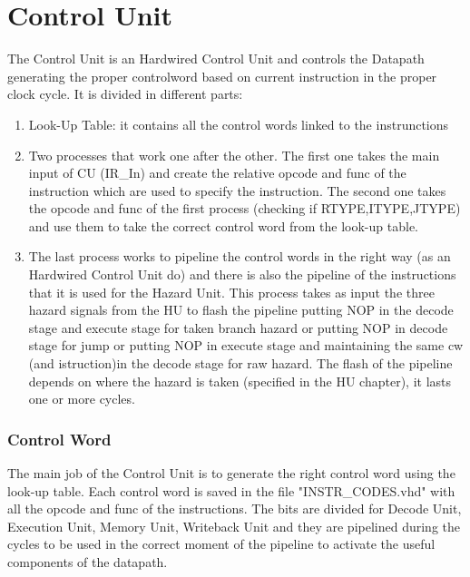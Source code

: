 \chapter{Control Unit}
\label{Control Unit}
The Control Unit is an Hardwired Control Unit and controls the Datapath generating the proper controlword based on current instruction in the proper clock cycle. It is divided in different parts:
\begin{enumerate} 
    \item Look-Up Table: it contains all the control words linked to the instrunctions
    \item Two processes that work one after the other. The first one takes the main input of CU (IR_In) and create the relative opcode and func of the instruction which are used to specify the instruction.
    The second one takes the opcode and func of the first process (checking if RTYPE,ITYPE,JTYPE) and use them to take the correct control word from the look-up table.
    \item The last process works to pipeline the control words in the right way (as an Hardwired Control Unit do) and there is also the pipeline of the instructions that it is used for the Hazard Unit.
    This process takes as input the three hazard signals from the HU to flash the pipeline putting NOP in the decode stage and execute stage for taken branch hazard or putting NOP in decode stage for jump or putting NOP in execute stage and maintaining the same cw (and istruction)in the decode stage for raw hazard.
    The flash of the pipeline depends on where the hazard is taken (specified in the HU chapter), it lasts one or more cycles. 
\end{enumerate}
\subsection{Control Word}
The main job of the Control Unit is to generate the right control word using the look-up table. Each control word is saved in the file "INSTR_CODES.vhd" with all the opcode and func of the instructions.
The bits are divided for Decode Unit, Execution Unit, Memory Unit, Writeback Unit and they are pipelined during the cycles to be used in the correct moment of the pipeline to activate the useful components of the datapath.